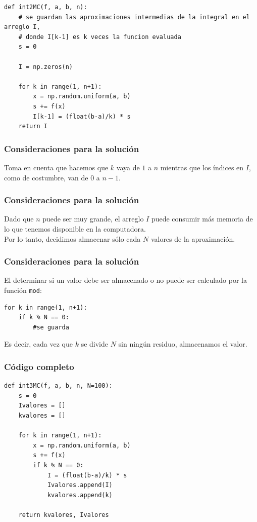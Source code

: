 \documentclass[12pt]{beamer}
\begin{document}
\begin{frame}
\begin{lstlisting}[caption=Código modificado para el ejercicio]
def int2MC(f, a, b, n):
    # se guardan las aproximaciones intermedias de la integral en el arreglo I,
    # donde I[k-1] es k veces la funcion evaluada
    s = 0

    I = np.zeros(n)

    for k in range(1, n+1):
        x = np.random.uniform(a, b)
        s += f(x)
        I[k-1] = (float(b-a)/k) * s
    return I
\end{lstlisting}
\end{frame}
\begin{frame}
\frametitle{Consideraciones para la solución}
Toma en cuenta que hacemos que $k$ vaya de $1$ a $n$ mientras que los índices en $I$, como de costumbre, van de $0$ a $n-1$.
\end{frame}
\begin{frame}
\frametitle{Consideraciones para la solución}
Dado que $n$ puede ser muy grande, el arreglo $I$ puede consumir más memoria de lo que tenemos disponible en la computadora.
\\
\bigskip
\pause
Por lo tanto, decidimos almacenar sólo cada $N$ valores de la aproximación. 
\end{frame}
\begin{frame}
\frametitle{Consideraciones para la solución}
El determinar si un valor debe ser almacenado o no puede ser calculado por la función \texttt{mod}:
\begin{lstlisting}[caption=Almacenamiento de valores]
for k in range(1, n+1):
    if k % N == 0:
    	#se guarda
\end{lstlisting}
Es decir, cada vez que $k$ se divide $N$ sin ningún residuo, almacenamos el valor.
\end{frame}
\begin{frame}
\frametitle{Código completo}
\begin{lstlisting}[caption=Código completo para el ejercicio]
def int3MC(f, a, b, n, N=100):
    s = 0
    Ivalores = []
    kvalores = []
    
    for k in range(1, n+1):
        x = np.random.uniform(a, b)
        s += f(x)
        if k % N == 0:
            I = (float(b-a)/k) * s
            Ivalores.append(I)
            kvalores.append(k)
    
    return kvalores, Ivalores
\end{lstlisting}
\end{frame}
\end{document}
